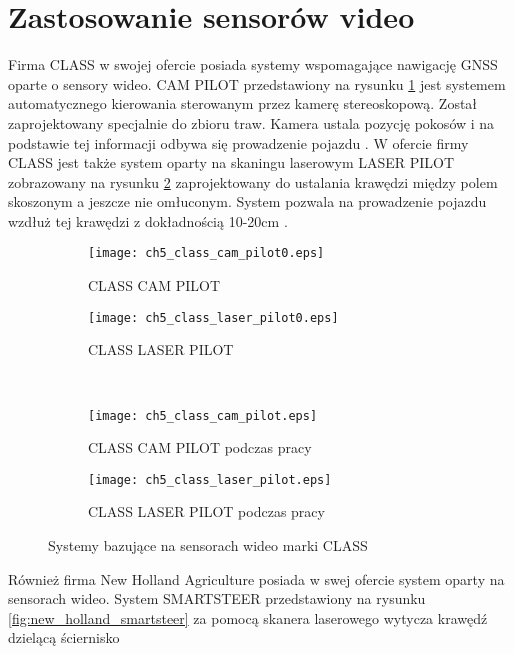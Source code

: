 \section{Zastosowanie sensorów video}
Firma CLASS w swojej ofercie posiada systemy wspomagające nawigację GNSS oparte o sensory wideo. CAM PILOT przedstawiony na rysunku \ref{fig:class_cam_pilot1}
jest systemem automatycznego kierowania sterowanym przez kamerę stereoskopową. Został zaprojektowany specjalnie do zbioru traw. Kamera ustala pozycję pokosów 
i na podstawie tej informacji odbywa się prowadzenie pojazdu \cite[][strona 7]{CLAAS_stearing_systems}.
W ofercie firmy CLASS jest także system oparty na skaningu laserowym LASER PILOT zobrazowany na 
rysunku \ref{fig:class_laser_pilot1} zaprojektowany do ustalania krawędzi między polem skoszonym a jeszcze nie omłuconym. System pozwala na 
prowadzenie pojazdu wzdłuż tej krawędzi z dokładnością 10-20cm \cite[][strona 6]{CLAAS_stearing_systems}.
\begin{figure}[H]
\centering
	\begin{subfigure}{0.4\textwidth}
		\centering
		\texttt{[image: ch5\_class\_cam\_pilot0.eps]}
		\label{fig:class_cam_pilot1}
		\caption{CLASS CAM PILOT}
	\end{subfigure}
	\begin{subfigure}{0.4\textwidth}
                \centering
                \texttt{[image: ch5\_class\_laser\_pilot0.eps]}
                \label{fig:class_laser_pilot1}
                \caption{CLASS LASER PILOT}
	\end{subfigure} \\
	\vfill
	\begin{subfigure}{0.4\textwidth}
                \centering
                \texttt{[image: ch5\_class\_cam\_pilot.eps]}
                \label{fig:class_cam_pilot2}
                \caption{CLASS CAM PILOT podczas pracy}
	\end{subfigure}
	\begin{subfigure}{0.4\textwidth}
                \centering
                \texttt{[image: ch5\_class\_laser\_pilot.eps]}
                \label{fig:class_laser_pilot2}
                \caption{CLASS LASER PILOT podczas pracy}
	\end{subfigure}
\caption{Systemy bazujące na sensorach wideo marki CLASS}
\end{figure}
\indent Również firma New Holland Agriculture posiada w swej ofercie system oparty na sensorach wideo.
System SMARTSTEER przedstawiony na rysunku \ref{fig:new_holland_smartsteer} za pomocą skanera laserowego wytycza krawędź dzielącą ściernisko 
